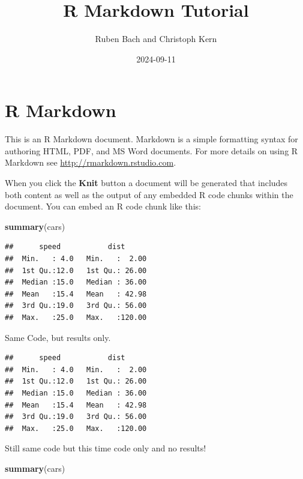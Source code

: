\documentclass[
]{article}
\title{R Markdown Tutorial}
\author{Ruben Bach and Christoph Kern}
\date{2024-09-11}
\newenvironment{Shaded}{\begin{snugshade}}{\end{snugshade}}
\newcommand{\FunctionTok}[1]{\textcolor[rgb]{0.13,0.29,0.53}{\textbf{#1}}}
\newcommand{\NormalTok}[1]{#1}
\begin{document}
\maketitle

{
\hypersetup{linkcolor=}
\setcounter{tocdepth}{2}
\tableofcontents
}
\section{R Markdown}\label{r-markdown}

This is an R Markdown document. Markdown is a simple formatting syntax
for authoring HTML, PDF, and MS Word documents. For more details on
using R Markdown see \url{http://rmarkdown.rstudio.com}.

When you click the \textbf{Knit} button a document will be generated
that includes both content as well as the output of any embedded R code
chunks within the document. You can embed an R code chunk like this:

\begin{Shaded}
\begin{Highlighting}[]
\FunctionTok{summary}\NormalTok{(cars)}
\end{Highlighting}
\end{Shaded}

\begin{verbatim}
##      speed           dist       
##  Min.   : 4.0   Min.   :  2.00  
##  1st Qu.:12.0   1st Qu.: 26.00  
##  Median :15.0   Median : 36.00  
##  Mean   :15.4   Mean   : 42.98  
##  3rd Qu.:19.0   3rd Qu.: 56.00  
##  Max.   :25.0   Max.   :120.00
\end{verbatim}

Same Code, but results only.

\begin{verbatim}
##      speed           dist       
##  Min.   : 4.0   Min.   :  2.00  
##  1st Qu.:12.0   1st Qu.: 26.00  
##  Median :15.0   Median : 36.00  
##  Mean   :15.4   Mean   : 42.98  
##  3rd Qu.:19.0   3rd Qu.: 56.00  
##  Max.   :25.0   Max.   :120.00
\end{verbatim}

Still same code but this time code only and no results!

\begin{Shaded}
\begin{Highlighting}[]
\FunctionTok{summary}\NormalTok{(cars)}
\end{Highlighting}
\end{Shaded}
\end{document}
